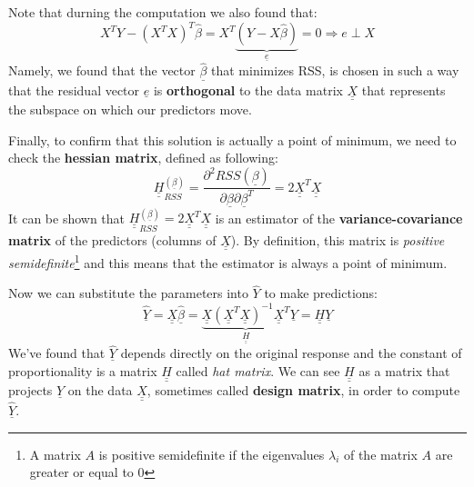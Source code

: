 Note that durning the computation we also found that:
\[
    X^T Y - (X^T X)^T \hat \beta = X^T\underbrace{(Y-X\hat{\beta})}_{\underline {e}} = 0 \Rightarrow e \perp X
\]
Namely, we found that the vector $\hat{\underline \beta}$ that minimizes RSS, is chosen in such a way that the residual vector $\underline e$ is \textbf{orthogonal} to the data matrix $\underline {\underline X}$ that represents the subspace on which our predictors move.

Finally, to confirm that this solution is actually a point of minimum, we need to check the \textbf{hessian matrix}, defined as following:
\[
    \underline {\underline H}_{RSS}^{(\underline\beta)} = \frac{\partial^2 RSS(\underline\beta)}{\partial \underline\beta \partial \underline\beta^T} = 2 \underline {\underline X}^T \underline {\underline X}
\]
It can be shown that $\underline {\underline H}_{RSS}^{(\underline\beta)} = 2 \underline {\underline X}^T \underline {\underline X}$ is an estimator of the \textbf{variance-covariance matrix} of the predictors (columns of $\underline {\underline X}$). By definition, this matrix is \textit{positive semidefinite}\footnote{A matrix $A$ is positive semidefinite if the eigenvalues $\lambda_i$ of the matrix $A$ are greater or equal to 0} and this means that the estimator is always a point of minimum.

Now we can substitute the parameters into $\hat{Y}$ to make predictions:
\[
    \underline{\hat{Y}} = \underline{\underline{X}} \underline{\hat{\beta}} =   \underbrace{\underline{\underline{X}} (\underline {\underline X}^T \underline {\underline X})^{-1} \underline {\underline X}^T}_{\underline {\underline H}} \underline Y = \underline {\underline H}\underline Y
\]
We've found that $\hat{\underline Y}$ depends directly on the original response and the constant of proportionality is a matrix $\underline {\underline H}$ called \textit{hat matrix}.
We can see $\underline {\underline H}$ as a matrix that projects $\underline Y$ on the data $\underline {\underline X}$, sometimes called \textbf{design matrix}, in order to compute $\hat{\underline Y}$.

